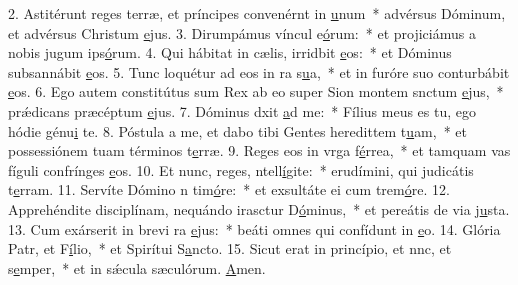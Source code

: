 2. Astitérunt reges terræ, et príncipes convenérnt in \uline{u}num~* advérsus Dóminum, et advérsus Christum \uline{e}jus.
3. Dirumpámus víncul e\uline{ó}rum:~* et projiciámus a nobis jugum ips\uline{ó}rum.
4. Qui hábitat in cælis, irridbit \uline{e}os:~* et Dóminus subsannábit \uline{e}os.
5. Tunc loquétur ad eos in ra s\uline{u}a,~* et in furóre suo conturbábit \uline{e}os.
6. Ego autem constitútus sum Rex ab eo super Sion montem snctum \uline{e}jus,~* prǽdicans præcéptum \uline{e}jus.
7. Dóminus dxit \uline{a}d me:~* Fílius meus es tu, ego hódie génu\uline{i} te.
8. Póstula a me, et dabo tibi Gentes heredittem t\uline{u}am,~* et possessiónem tuam términos t\uline{e}rræ.
9. Reges eos in vrga f\uline{é}rrea,~* et tamquam vas fíguli confrínges \uline{e}os.
10. Et nunc, reges, ntell\uline{í}gite:~* erudímini, qui judicátis t\uline{e}rram.
11. Servíte Dómino n tim\uline{ó}re:~* et exsultáte ei cum trem\uline{ó}re.
12. Apprehéndite disciplínam, nequándo irasctur D\uline{ó}minus,~* et pereátis de via j\uline{u}sta.
13. Cum exárserit in brevi ra \uline{e}jus:~* beáti omnes qui confídunt in \uline{e}o.
14. Glória Patr, et F\uline{í}lio,~* et Spirítui S\uline{a}ncto.
15. Sicut erat in princípio, et nnc, et s\uline{e}mper,~* et in sǽcula sæculórum. \uline{A}men.
